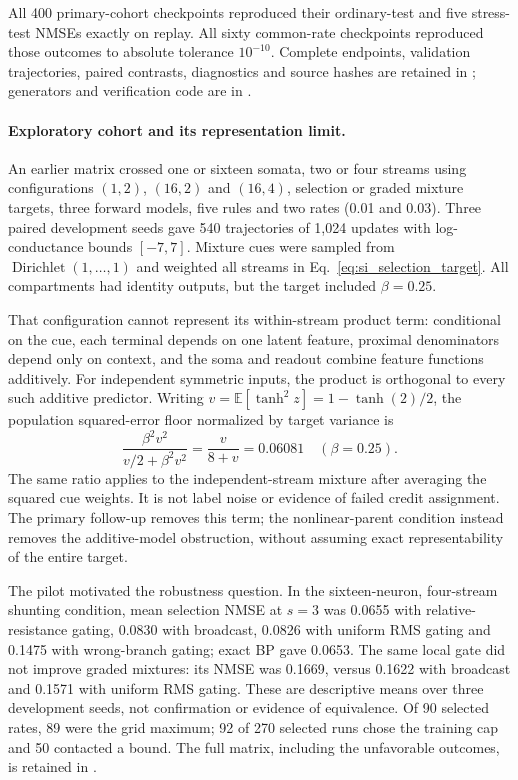 All 400 primary-cohort checkpoints reproduced their ordinary-test and five
stress-test NMSEs exactly on replay. All sixty common-rate checkpoints
reproduced those outcomes to absolute tolerance $10^{-10}$. Complete
endpoints, validation trajectories, paired contrasts, diagnostics and source
hashes are retained in
; generators
and verification code are in .

\paragraph{Exploratory cohort and its representation limit.}
An earlier matrix crossed one or sixteen somata, two or four streams
using configurations $(1,2)$, $(16,2)$ and $(16,4)$, selection or graded
mixture targets, three forward models, five rules and two rates
(0.01 and 0.03). Three paired development seeds gave 540 trajectories
of 1,024 updates with log-conductance bounds $[-7,7]$. Mixture cues
were sampled from $\operatorname{Dirichlet}(1,\ldots,1)$ and weighted
all streams in Eq.~\ref{eq:si_selection_target}. All compartments had
identity outputs, but the target included $\beta=0.25$.

That configuration cannot represent its within-stream product term:
conditional on the cue, each terminal depends on one latent feature,
proximal denominators depend only on context, and the soma and readout
combine feature functions additively. For independent symmetric inputs,
the product is orthogonal to every such additive predictor. Writing
$v=\mathbb E[\tanh^2z]=1-\tanh(2)/2$, the population squared-error floor
normalized by target variance is
\begin{equation}
\frac{\beta^2v^2}{v/2+\beta^2v^2}
=\frac{v}{8+v}=0.06081\quad(\beta=0.25).
\end{equation}
The same ratio applies to the independent-stream mixture after averaging
the squared cue weights. It is not label noise or evidence of failed credit
assignment. The primary follow-up removes this term; the nonlinear-parent
condition instead removes the additive-model obstruction, without assuming
exact representability of the entire target.

The pilot motivated the robustness question. In the sixteen-neuron,
four-stream shunting condition, mean selection NMSE at $s=3$ was 0.0655
with relative-resistance gating, 0.0830 with broadcast, 0.0826 with uniform
RMS gating and 0.1475 with wrong-branch gating; exact BP gave 0.0653.
The same local gate did not improve graded mixtures: its NMSE was 0.1669,
versus 0.1622 with broadcast and 0.1571 with uniform RMS gating.
These are descriptive means over three development seeds, not confirmation
or evidence of equivalence. Of 90 selected rates, 89 were the grid maximum;
92 of 270 selected runs chose the training cap and 50 contacted a bound.
The full matrix, including the unfavorable outcomes, is retained in
.

